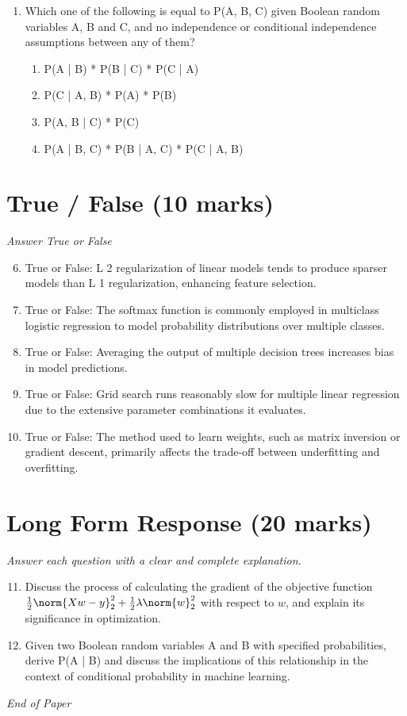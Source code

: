 \documentclass[12pt]{article}
\begin{document}
\begin{enumerate}[label=\arabic*.]
\begin{enumerate}[label=(\alph*)]
\end{enumerate}
\item Which one of the following is equal to P(A, B, C) given Boolean random variables A, B and C, and no independence or conditional independence assumptions between any of them?
\begin{enumerate}[label=(\alph*)]
    \item P(A | B) * P(B | C) * P(C | A)
    \item P(C | A, B) * P(A) * P(B)
    \item P(A, B | C) * P(C)
    \item P(A | B, C) * P(B | A, C) * P(C | A, B)
\end{enumerate}
\end{enumerate}

\section*{True / False (10 marks)}
\textit{Answer True or False}
\begin{enumerate}[label=\arabic*.]
\setcounter{enumi}{5}
\item True or False: L 2 regularization of linear models tends to produce sparser models than L 1 regularization, enhancing feature selection.
\item True or False: The softmax function is commonly employed in multiclass logistic regression to model probability distributions over multiple classes.
\item True or False: Averaging the output of multiple decision trees increases bias in model predictions.
\item True or False: Grid search runs reasonably slow for multiple linear regression due to the extensive parameter combinations it evaluates.
\item True or False: The method used to learn weights, such as matrix inversion or gradient descent, primarily affects the trade-off between underfitting and overfitting.
\end{enumerate}

\section*{Long Form Response (20 marks)}
\textit{Answer each question with a clear and complete explanation.}
\begin{enumerate}[label=\arabic*.]
\setcounter{enumi}{10}
\item Discuss the process of calculating the gradient of the objective function $\frac{1}{2} \norm{Xw-y}^2_2 + \frac{1}{2}\lambda \norm{w}^2_2$ with respect to $w$, and explain its significance in optimization.
\item Given two Boolean random variables A and B with specified probabilities, derive P(A | B) and discuss the implications of this relationship in the context of conditional probability in machine learning.
\end{enumerate}

\vfill
\noindent\textit{End of Paper}
\end{document}
